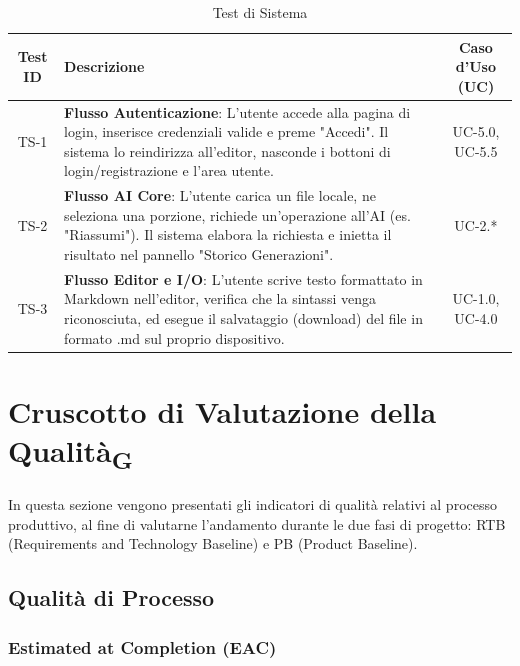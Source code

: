 \documentclass[11pt,a4paper]{article}
\begin{document}
\begin{table}[H]
    \centering
    \small
    \begin{tabularx}{\textwidth}{|c|X|c|}
        \hline
        \textbf{Test ID} & \textbf{Descrizione} & \textbf{Caso d'Uso (UC)} \\
        \hline
        TS-1 & \textbf{Flusso Autenticazione}: L'utente accede alla pagina di login, inserisce credenziali valide e preme "Accedi". Il sistema lo reindirizza all'editor, nasconde i bottoni di login/registrazione e l'area utente. & UC-5.0, UC-5.5 \\
        \hline
        TS-2 & \textbf{Flusso AI Core}: L'utente carica un file locale, ne seleziona una porzione, richiede un'operazione all'AI (es. "Riassumi"). Il sistema elabora la richiesta e inietta il risultato nel pannello "Storico Generazioni". & UC-2.* \\
        \hline
        TS-3 & \textbf{Flusso Editor e I/O}: L'utente scrive testo formattato in Markdown nell'editor, verifica che la sintassi venga riconosciuta, ed esegue il salvataggio (download) del file in formato .md sul proprio dispositivo. & UC-1.0, UC-4.0 \\
        \hline
    \end{tabularx}
    \caption{Test di Sistema}
\end{table}


\newpage
\section{Cruscotto di Valutazione della Qualità\textsubscript{G}}
In questa sezione vengono presentati gli indicatori di qualità relativi al processo produttivo, al fine di valutarne l'andamento durante le due fasi di progetto: RTB (Requirements and Technology Baseline) e PB (Product Baseline).

\subsection{Qualità di Processo}

\subsubsection{Estimated at Completion (EAC)}
\end{document}
